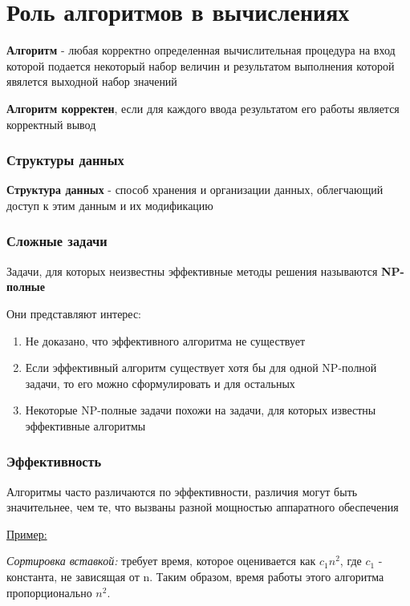 \documentclass[a4paper, 12pt]{article}
\begin{document}
\part{Роль алгоритмов в вычислениях}


\textbf{Алгоритм} - любая корректно определенная вычислительная процедура на вход которой подается некоторый набор величин и 
результатом выполнения которой явялется выходной набор значений

\textbf{Алгоритм корректен}, если для каждого ввода результатом его работы является корректный вывод

\section{Структуры данных}

\textbf{Структура данных} - способ хранения и организации данных, облегчающий доступ к этим данным и их модификацию

\section{Сложные задачи}

Задачи, для которых неизвестны эффективные методы решения называются \textbf{NP-полные}

Они представляют интерес:

\begin{enumerate}
    \item Не доказано, что эффективного алгоритма не существует
    \item Если эффективный алгоритм существует хотя бы для одной NP-полной задачи, то его можно сформулировать и для остальных
    \item Некоторые NP-полные задачи похожи на задачи, для которых известны эффективные алгоритмы
\end{enumerate}


\section{Эффективность}

Алгоритмы часто различаются по эффективности, различия могут быть значительнее, чем те, что вызваны разной мощностью аппаратного обеспечения

\underline{Пример:}

\textit{Сортировка вставкой:} требует время, которое оценивается как $c_1n^2$, где $c_1$ - константа, не зависящая от n.
Таким образом, время работы этого алгоритма пропорционально $n^2$.
\end{document}
